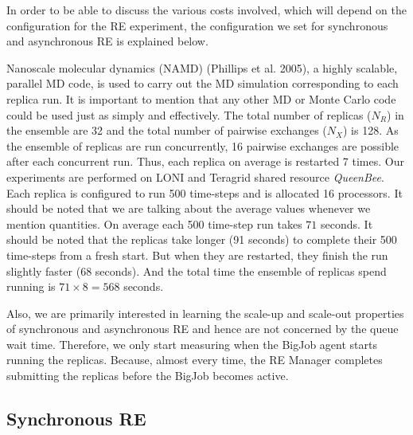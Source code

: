 \documentclass{rspublic}
\newcommand{\alnote}[1]{ {\textcolor{blue} { ***andre: #1 }}}
\newcommand{\athotanote}[1]{ {\textcolor{green} { ***athota: #1 }}}
\newcommand{\alnote}[1]{}
\newcommand{\athotanote}[1]{}
\begin{document}
In order to be able to discuss the various costs involved, 
which will depend on the configuration for the RE experiment, 
the configuration we set for synchronous and asynchronous RE is explained below.

Nanoscale molecular dynamics (NAMD) (Phillips et al.  2005), a highly
scalable, parallel MD code, is used to carry out the MD simulation
corresponding to each replica run. It is important to mention that any
other MD or Monte Carlo code could be used just as simply and
effectively. The total number of replicas ($N_R$) in the ensemble are
32 and the total number of pairwise exchanges ($N_X$) is 128. As the
ensemble of replicas are run concurrently, 16 pairwise exchanges are
possible after each concurrent run. Thus, each replica on average is
restarted 7 times.  Our experiments are performed on LONI and Teragrid
shared resource \emph{QueenBee}. Each replica is configured to run 500
time-steps and is allocated 16 processors. It should be noted that we
are talking about the average values whenever we mention
quantities. %
On average each 500 time-step run takes $71$ seconds. 
It should be noted that the replicas take longer (91 seconds) to
complete their 500 time-steps from a fresh start. But when they are
restarted, they finish the run slightly faster (68 seconds).  And the
total time the ensemble of replicas spend running is $71 \times 8 =
568$ seconds.
  
Also, we are primarily interested in learning the scale-up and
scale-out properties of synchronous and asynchronous RE and hence are
not concerned by the queue wait time. Therefore, we only start
measuring when the BigJob agent starts running the replicas. Because,
almost every time, the RE Manager completes submitting the replicas
before the BigJob becomes active.

\subsection{Synchronous RE}

\end{document}
